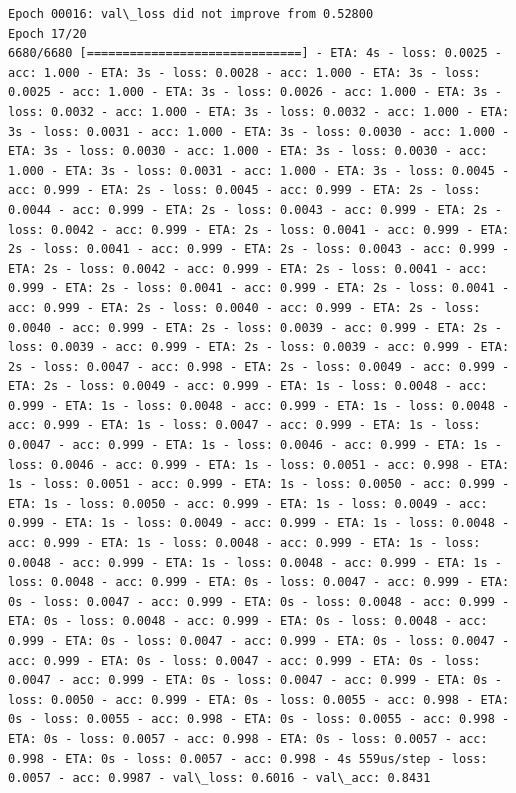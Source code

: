 \documentclass[11pt]{article}
\begin{document}
\begin{Verbatim}[commandchars=\\\{\}]
Epoch 00016: val\_loss did not improve from 0.52800
Epoch 17/20
6680/6680 [==============================] - ETA: 4s - loss: 0.0025 - acc: 1.000 - ETA: 3s - loss: 0.0028 - acc: 1.000 - ETA: 3s - loss: 0.0025 - acc: 1.000 - ETA: 3s - loss: 0.0026 - acc: 1.000 - ETA: 3s - loss: 0.0032 - acc: 1.000 - ETA: 3s - loss: 0.0032 - acc: 1.000 - ETA: 3s - loss: 0.0031 - acc: 1.000 - ETA: 3s - loss: 0.0030 - acc: 1.000 - ETA: 3s - loss: 0.0030 - acc: 1.000 - ETA: 3s - loss: 0.0030 - acc: 1.000 - ETA: 3s - loss: 0.0031 - acc: 1.000 - ETA: 3s - loss: 0.0045 - acc: 0.999 - ETA: 2s - loss: 0.0045 - acc: 0.999 - ETA: 2s - loss: 0.0044 - acc: 0.999 - ETA: 2s - loss: 0.0043 - acc: 0.999 - ETA: 2s - loss: 0.0042 - acc: 0.999 - ETA: 2s - loss: 0.0041 - acc: 0.999 - ETA: 2s - loss: 0.0041 - acc: 0.999 - ETA: 2s - loss: 0.0043 - acc: 0.999 - ETA: 2s - loss: 0.0042 - acc: 0.999 - ETA: 2s - loss: 0.0041 - acc: 0.999 - ETA: 2s - loss: 0.0041 - acc: 0.999 - ETA: 2s - loss: 0.0041 - acc: 0.999 - ETA: 2s - loss: 0.0040 - acc: 0.999 - ETA: 2s - loss: 0.0040 - acc: 0.999 - ETA: 2s - loss: 0.0039 - acc: 0.999 - ETA: 2s - loss: 0.0039 - acc: 0.999 - ETA: 2s - loss: 0.0039 - acc: 0.999 - ETA: 2s - loss: 0.0047 - acc: 0.998 - ETA: 2s - loss: 0.0049 - acc: 0.999 - ETA: 2s - loss: 0.0049 - acc: 0.999 - ETA: 1s - loss: 0.0048 - acc: 0.999 - ETA: 1s - loss: 0.0048 - acc: 0.999 - ETA: 1s - loss: 0.0048 - acc: 0.999 - ETA: 1s - loss: 0.0047 - acc: 0.999 - ETA: 1s - loss: 0.0047 - acc: 0.999 - ETA: 1s - loss: 0.0046 - acc: 0.999 - ETA: 1s - loss: 0.0046 - acc: 0.999 - ETA: 1s - loss: 0.0051 - acc: 0.998 - ETA: 1s - loss: 0.0051 - acc: 0.999 - ETA: 1s - loss: 0.0050 - acc: 0.999 - ETA: 1s - loss: 0.0050 - acc: 0.999 - ETA: 1s - loss: 0.0049 - acc: 0.999 - ETA: 1s - loss: 0.0049 - acc: 0.999 - ETA: 1s - loss: 0.0048 - acc: 0.999 - ETA: 1s - loss: 0.0048 - acc: 0.999 - ETA: 1s - loss: 0.0048 - acc: 0.999 - ETA: 1s - loss: 0.0048 - acc: 0.999 - ETA: 1s - loss: 0.0048 - acc: 0.999 - ETA: 0s - loss: 0.0047 - acc: 0.999 - ETA: 0s - loss: 0.0047 - acc: 0.999 - ETA: 0s - loss: 0.0048 - acc: 0.999 - ETA: 0s - loss: 0.0048 - acc: 0.999 - ETA: 0s - loss: 0.0048 - acc: 0.999 - ETA: 0s - loss: 0.0047 - acc: 0.999 - ETA: 0s - loss: 0.0047 - acc: 0.999 - ETA: 0s - loss: 0.0047 - acc: 0.999 - ETA: 0s - loss: 0.0047 - acc: 0.999 - ETA: 0s - loss: 0.0047 - acc: 0.999 - ETA: 0s - loss: 0.0050 - acc: 0.999 - ETA: 0s - loss: 0.0055 - acc: 0.998 - ETA: 0s - loss: 0.0055 - acc: 0.998 - ETA: 0s - loss: 0.0055 - acc: 0.998 - ETA: 0s - loss: 0.0057 - acc: 0.998 - ETA: 0s - loss: 0.0057 - acc: 0.998 - ETA: 0s - loss: 0.0057 - acc: 0.998 - 4s 559us/step - loss: 0.0057 - acc: 0.9987 - val\_loss: 0.6016 - val\_acc: 0.8431


\end{Verbatim}
\end{document}
